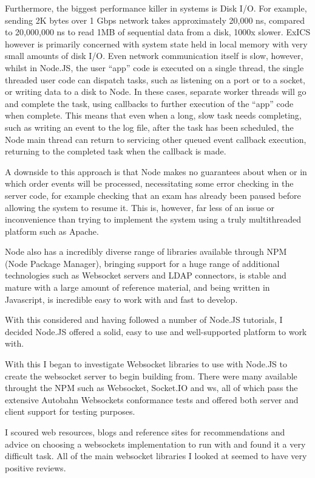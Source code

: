 Furthermore, the biggest performance killer in systems is Disk I/O.\cite{IOperfKiller}  For example, sending 2K bytes over 1 Gbps network takes approximately 20,000 ns, compared to 20,000,000 ns to read 1MB of sequential data from a disk, 1000x slower.\cite{diskIOlatency}  ExICS however is primarily concerned with system state held in local memory with very small amounts of disk I/O. Even network communication itself is slow, however, whilst in Node.JS, the user ``app'' code is executed on a single thread, the single threaded user code can dispatch tasks, such as listening on a port or to a socket, or writing data to a disk to Node.  In these cases, separate worker threads will go and complete the task, using callbacks to further execution of the ``app'' code when complete.  This means that even when a long, slow task needs completing, such as writing an event to the log file, after the task has been scheduled, the Node main thread can return to servicing other queued event callback execution, returning to the completed task when the callback is made.  

A downside to this approach is that Node makes no guarantees about when or in which order events will be processed, necessitating some error checking in the server code, for example checking that an exam has already been paused before allowing the system to resume it.  This is, however, far less of an issue or inconvenience than trying to implement the system using a truly multithreaded platform such as Apache.

Node also has a incredibly diverse range of libraries available through NPM (Node Package Manager), bringing support for a huge range of additional technologies such as Websocket servers and LDAP connectors, is stable and mature with a large amount of reference material, and being written in Javascript, is incredible easy to work with and fast to develop.

With this considered and having followed a number of Node.JS tutorials, I decided Node.JS offered a solid, easy to use and well-supported platform to work with.

With this I began to investigate Websocket libraries to use with Node.JS to create the websocket server to begin building from.  There were many available throught the NPM such as Websocket, Socket.IO and ws, all of which pass the extensive Autobahn Websockets conformance tests and offered both server and client support for testing purposes.

I scoured web resources, blogs and reference sites for recommendations and advice \cite{whichwebsocket} on choosing a websockets implementation to run with and found it a very difficult task.  All of the main websocket libraries I looked at seemed to have very positive reviews.

